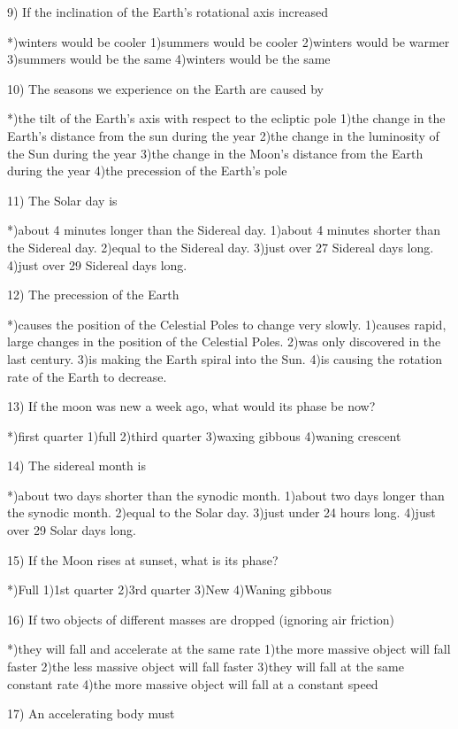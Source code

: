  9) If the inclination of the Earth's rotational axis increased
 
 *)winters would be cooler
 1)summers would be cooler
 2)winters would be warmer
 3)summers would be the same
 4)winters would be the same
 
10) The seasons we experience on the Earth are caused by
 
 *)the tilt of the Earth's axis with respect to the ecliptic pole
 1)the change in the Earth's distance from the sun during the year
 2)the change in the luminosity of the Sun during the year 
 3)the change in the Moon's distance from the Earth during the year
 4)the precession of the Earth's pole
 
11) The Solar day is
 
 *)about 4 minutes longer than the Sidereal day.
 1)about 4 minutes shorter than the Sidereal day.
 2)equal to the Sidereal day.
 3)just over 27 Sidereal days long.
 4)just over 29 Sidereal days long.
 
12) The precession of the Earth
 
 *)causes the position of the Celestial Poles to change very slowly.
 1)causes rapid, large changes in the position of the Celestial Poles.
 2)was only discovered in the last century.
 3)is making the Earth spiral into the Sun.
 4)is causing the rotation rate of the Earth to decrease.
 
13) If the moon was new a week ago, what would its phase be now?
 
 *)first quarter
 1)full
 2)third quarter
 3)waxing gibbous
 4)waning crescent
 
14) The sidereal month is
 
 *)about two days shorter than the synodic month.
 1)about two days longer than the synodic month.
 2)equal to the Solar day.
 3)just under 24 hours long.
 4)just over 29 Solar days long.
 
15) If the Moon rises at sunset, what is its phase?
 
 *)Full
 1)1st quarter
 2)3rd quarter
 3)New 
 4)Waning gibbous
 
16) If two objects of different masses are dropped (ignoring air friction)
 
 *)they will fall and accelerate at the same rate
 1)the more massive object will fall faster
 2)the less massive object will fall faster
 3)they will fall at the same constant rate
 4)the more massive object will fall at a constant speed
 
17) An accelerating body must
 
